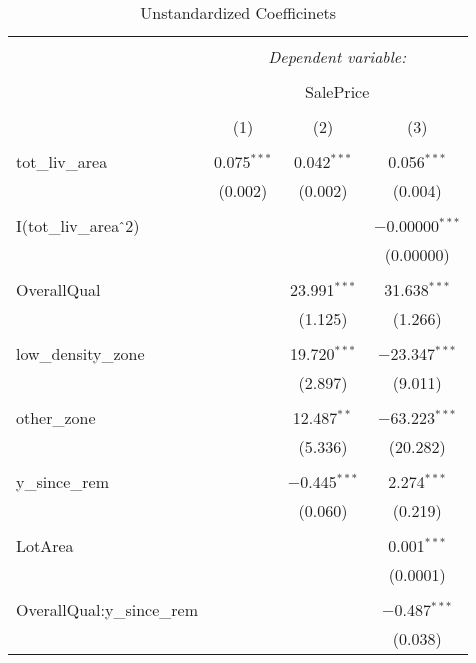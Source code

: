 \documentclass{article}
\begin{document}
\begin{table}[!htbp] \centering 
  \caption{Unstandardized Coefficinets} 
  \label{Unstandardized Coefficinets} 
\begin{tabular}{@{\extracolsep{5pt}}lccc} 
\\[-1.8ex]\hline 
\hline \\[-1.8ex] 
 & \multicolumn{3}{c}{\textit{Dependent variable:}} \\ 
\cline{2-4} 
\\[-1.8ex] & \multicolumn{3}{c}{SalePrice} \\ 
\\[-1.8ex] & (1) & (2) & (3)\\ 
\hline \\[-1.8ex] 
 tot\_liv\_area & 0.075$^{***}$ & 0.042$^{***}$ & 0.056$^{***}$ \\ 
  & (0.002) & (0.002) & (0.004) \\ 
  & & & \\ 
 I(tot\_liv\_area$\hat{\mkern6mu}$2) &  &  & $-$0.00000$^{***}$ \\ 
  &  &  & (0.00000) \\ 
  & & & \\ 
 OverallQual &  & 23.991$^{***}$ & 31.638$^{***}$ \\ 
  &  & (1.125) & (1.266) \\ 
  & & & \\ 
 low\_density\_zone &  & 19.720$^{***}$ & $-$23.347$^{***}$ \\ 
  &  & (2.897) & (9.011) \\ 
  & & & \\ 
 other\_zone &  & 12.487$^{**}$ & $-$63.223$^{***}$ \\ 
  &  & (5.336) & (20.282) \\ 
  & & & \\ 
 y\_since\_rem &  & $-$0.445$^{***}$ & 2.274$^{***}$ \\ 
  &  & (0.060) & (0.219) \\ 
  & & & \\ 
 LotArea &  &  & 0.001$^{***}$ \\ 
  &  &  & (0.0001) \\ 
  & & & \\ 
 OverallQual:y\_since\_rem &  &  & $-$0.487$^{***}$ \\ 
  &  &  & (0.038) \\ 

\end{tabular}
\end{table}
\end{document}

